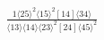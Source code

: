 \documentclass[varwidth, border=5pt]{standalone}
\begin{document}
\begin{my}
$\begin{gathered}
\scriptscriptstyle\frac{1⟨25⟩^2⟨15⟩^2[14]⟨34⟩}{⟨13⟩⟨14⟩⟨23⟩^2[24]⟨45⟩^2}
\end{gathered}$
\end{my}
\end{document}
